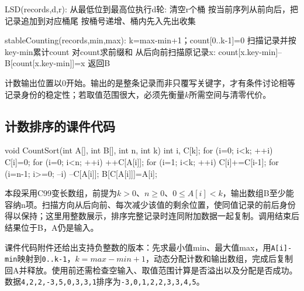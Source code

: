 \par\medskip\noindent\begin{minipage}{\linewidth}
\begin{codeblock}[language={}]
LSD(records,d,r):
    从最低位到最高位执行d轮:
        清空r个桶
        按当前序列从前向后，把记录追加到对应桶尾
        按桶号递增、桶内先入先出收集
\end{codeblock}
\end{minipage}\par\medskip

\par\medskip\noindent\begin{minipage}{\linewidth}
\begin{codeblock}[language={}]
stableCounting(records,min,max):
    k=max-min+1；count[0..k-1]=0
    扫描记录并按key-min累计count
    对count求前缀和
    从后向前扫描原记录x:
        count[x.key-min]--
        B[count[x.key-min]]=x
    返回B
\end{codeblock}
\end{minipage}\par\medskip

计数输出位置以0开始。输出的是整条记录而非只覆写关键字，才有条件讨论相等记录身份的稳定性；若取值范围很大，必须先衡量\(k\)所需空间与清零代价。

\subsection{计数排序的课件代码}\label{DS08-count-code}

\par\medskip\noindent\begin{minipage}{\linewidth}
\begin{codeblock}[language=C]
void CountSort(int A[], int B[], int n, int k) {
    int i, C[k];
    for (i=0; i<k; ++i) C[i]=0;
    for (i=0; i<n; ++i) ++C[A[i]];
    for (i=1; i<k; ++i) C[i]+=C[i-1];
    for (i=n-1; i>=0; --i) {
        --C[A[i]];
        B[C[A[i]]]=A[i];
    }
}
\end{codeblock}
\end{minipage}\par\medskip

本段采用C99变长数组，前提为\(k>0\)、\(n\ge0\)、\(0\le A[i]<k\)，输出数组B至少能容纳n项。扫描方向从后向前、每次减少该值的剩余位置，使同值记录的前后身份得以保持；这里用整数展示，排序完整记录时连同附加数据一起复制。调用结束后结果位于B，A仍是输入。

课件代码附件还给出支持负整数的版本：先求最小值min、最大值max，用\texttt{A[\allowbreak{}i]\allowbreak{}-min}映射到\texttt{0.\allowbreak{}.\allowbreak{}k-1}，\(k=max-min+1\)，动态分配计数和输出数组，完成后复制回A并释放。使用前还需检查空输入、取值范围计算是否溢出以及分配是否成功。数据\texttt{4,\allowbreak{}2,\allowbreak{}2,\allowbreak{}-3,\allowbreak{}5,\allowbreak{}0,\allowbreak{}3,\allowbreak{}3,\allowbreak{}1}排序为\texttt{-3,\allowbreak{}0,\allowbreak{}1,\allowbreak{}2,\allowbreak{}2,\allowbreak{}3,\allowbreak{}3,\allowbreak{}4,\allowbreak{}5}。

